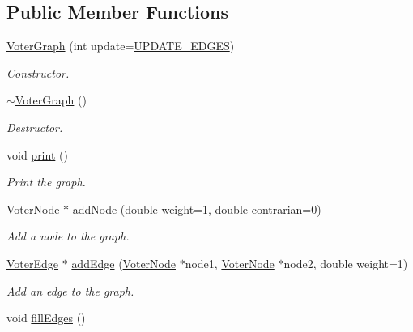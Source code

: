\subsection*{Public Member Functions}
\begin{DoxyCompactItemize}
\item 
\hyperlink{class_voter_graph_aa5e00e0f2d2d8de10a217633d4594814}{Voter\+Graph} (int update=\hyperlink{voter__graph_8hpp_a305d80651467e931f258a3686976d31c}{U\+P\+D\+A\+T\+E\+\_\+\+E\+D\+G\+E\+S})
\begin{DoxyCompactList}\small\item\em Constructor. \end{DoxyCompactList}\item 
\hypertarget{class_voter_graph_a84a3f081c6e15cf8d1635d6ee6d5e51e}{}\hyperlink{class_voter_graph_a84a3f081c6e15cf8d1635d6ee6d5e51e}{$\sim$\+Voter\+Graph} ()\label{class_voter_graph_a84a3f081c6e15cf8d1635d6ee6d5e51e}

\begin{DoxyCompactList}\small\item\em Destructor. \end{DoxyCompactList}\item 
\hypertarget{class_voter_graph_aacb7bbd4bcc7f923b2784b0bcefcd1a3}{}void \hyperlink{class_voter_graph_aacb7bbd4bcc7f923b2784b0bcefcd1a3}{print} ()\label{class_voter_graph_aacb7bbd4bcc7f923b2784b0bcefcd1a3}

\begin{DoxyCompactList}\small\item\em Print the graph. \end{DoxyCompactList}\item 
\hyperlink{class_voter_node}{Voter\+Node} $\ast$ \hyperlink{class_voter_graph_af53017970f3ac08838b67f4a09171b92}{add\+Node} (double weight=1, double contrarian=0)
\begin{DoxyCompactList}\small\item\em Add a node to the graph. \end{DoxyCompactList}\item 
\hyperlink{class_voter_edge}{Voter\+Edge} $\ast$ \hyperlink{class_voter_graph_a1f6b8be82800577c45908102251f1e35}{add\+Edge} (\hyperlink{class_voter_node}{Voter\+Node} $\ast$node1, \hyperlink{class_voter_node}{Voter\+Node} $\ast$node2, double weight=1)
\begin{DoxyCompactList}\small\item\em Add an edge to the graph. \end{DoxyCompactList}\item 
\hypertarget{class_voter_graph_aa86a23e7d5984c3c6bbea76f193b73ae}{}void \hyperlink{class_voter_graph_aa86a23e7d5984c3c6bbea76f193b73ae}{fill\+Edges} ()\label{class_voter_graph_aa86a23e7d5984c3c6bbea76f193b73ae}


\end{DoxyCompactItemize}
